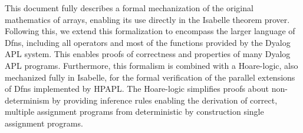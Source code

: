 This document fully describes a formal mechanization of the original 
mathematics of arrays, enabling its use directly in the Isabelle 
theorem prover. Following this, we extend this formalization to encompass
the larger language of Dfns, including all operators and most of the 
functions provided by the Dyalog APL system. This enables proofs of 
correctness and properties of many Dyalog APL programs. Furthermore, 
this formalism is combined with a Hoare-logic, also mechanized fully 
in Isabelle, for the formal verification of the parallel extensions 
of Dfns implemented by HPAPL. The Hoare-logic simplifies proofs about 
non-determinism by providing inference rules enabling the derivation 
of correct, multiple assignment programs from deterministic by construction 
single assignment programs.




